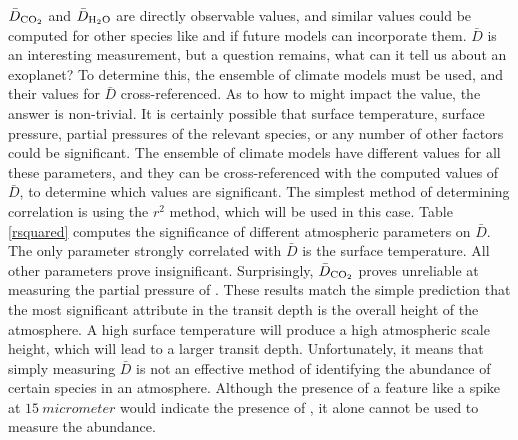 $\bar{D}_{\mathrm{CO_2}}$ and $\bar{D}_{\mathrm{H_2O}}$ are directly observable values,
 and similar values could be computed for other species like  and
  if future models can incorporate them. $\bar{D}$ is an interesting
 measurement, but a question remains, what can it tell us about an exoplanet?
 To determine this, the ensemble of climate models must be used, and their
 values for $\bar{D}$ cross-referenced. As to how to might impact the value,
 the answer is non-trivial. It is certainly possible that surface temperature,
 surface pressure, partial pressures of the relevant species, or any number of
 other factors could be significant. The ensemble of climate models have
 different values for all these parameters, and they can be cross-referenced
 with the computed values of $\bar{D}$, to determine which values are
 significant. The simplest method of determining correlation is using the $r^2$
 method, which will be used in this case. Table \ref{rsquared} computes the
 significance of different atmospheric parameters on $\bar{D}$. The only
 parameter strongly correlated with $\bar{D}$ is the surface temperature. All
 other parameters prove insignificant. Surprisingly, $\bar{D}_{\mathrm{CO_2}}$
 proves unreliable at measuring the partial pressure of . These
 results match the simple prediction that the most significant attribute in the
 transit depth is the overall height of the atmosphere. A high surface
 temperature will
 produce a high atmospheric scale height, which will lead to a larger transit
 depth. Unfortunately, it means that simply measuring $\bar{D}$ is not an
 effective method of identifying the abundance of certain species in an
 atmosphere. Although the presence of a feature like a spike at
 $\SI{15}{micrometer}$ would
 indicate the presence of , it alone cannot be used to measure
 the abundance.

